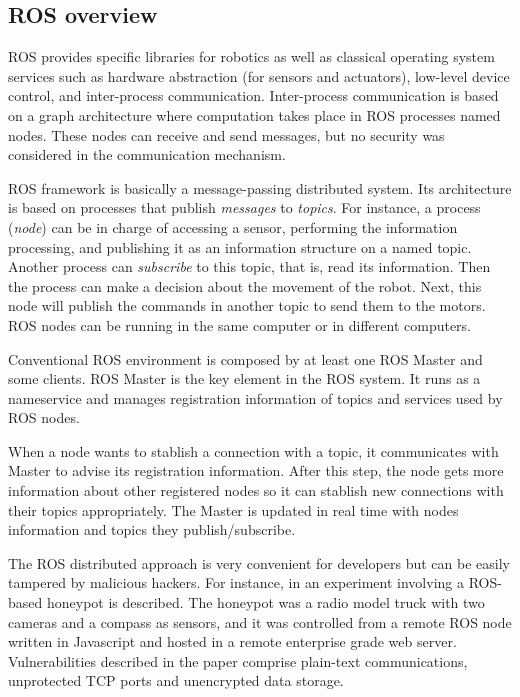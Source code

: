 \documentclass[journal,twoside]{JoPhA}
\begin{document}
\subsection{ROS overview}

ROS provides specific libraries for robotics as well as classical operating system services such as hardware abstraction (for sensors and actuators), low-level device control, and inter-process communication. Inter-process communication is based on a graph architecture where computation takes place in ROS processes named nodes. These nodes can receive and send messages, but no security was considered in the communication mechanism.

ROS framework is basically a message-passing distributed system. Its architecture is based on processes that publish {\em messages} to {\em topics}. For instance, a process ({\em node}) can be in charge of accessing a sensor, performing the information processing, and publishing it as an information structure on a named topic. Another process can {\em subscribe} to this topic, that is, read its information. Then the process can make a decision about the movement of the robot. Next, this node will publish the commands in another topic to send them to the motors. ROS nodes can be running in the same computer or in different computers.

Conventional ROS environment is composed by at least one ROS Master and some clients. ROS Master is the key element in the ROS system. It runs as a nameservice and manages registration information of topics and services used by ROS nodes. 

When a node wants to stablish a connection with a topic, it communicates with Master to advise its registration information. After this step, the node gets more information about other registered nodes so it can stablish new connections with their topics appropriately. The Master is updated in real time with nodes information and topics they publish/subscribe.


The ROS distributed approach is very convenient for developers but can be easily tampered by malicious hackers. For instance, in \cite{McClean2013} an experiment involving a ROS-based honeypot is described. The honeypot was a radio model truck with two cameras and a compass as sensors, and it was controlled from a remote ROS node written in Javascript and hosted in a remote enterprise grade web server. Vulnerabilities described in the paper comprise plain-text communications, unprotected TCP ports and unencrypted data storage.
\end{document}
